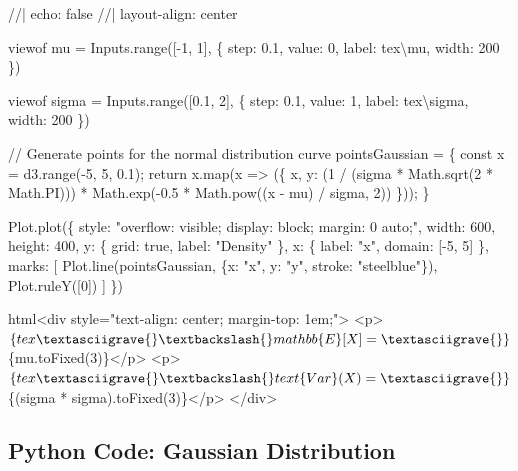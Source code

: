 \documentclass[
  letterpaper,
  DIV=11,
  numbers=noendperiod]{scrreprt}
\newenvironment{Shaded}{\begin{snugshade}}{\end{snugshade}}
\newcommand{\NormalTok}[1]{\textcolor[rgb]{0.00,0.23,0.31}{#1}}
\begin{document}
\label{observable}
\begin{Shaded}
\begin{Highlighting}[]
\NormalTok{//| echo: false}
\NormalTok{//| layout{-}align: center}

\NormalTok{viewof mu = Inputs.range([{-}1, 1], \{}
\NormalTok{  step: 0.1,}
\NormalTok{  value: 0,}
\NormalTok{  label: tex\textasciigrave{}\textbackslash{}mu\textasciigrave{},}
\NormalTok{  width: 200}
\NormalTok{\})}

\NormalTok{viewof sigma = Inputs.range([0.1, 2], \{}
\NormalTok{  step: 0.1,}
\NormalTok{  value: 1,}
\NormalTok{  label: tex\textasciigrave{}\textbackslash{}sigma\textasciigrave{},}
\NormalTok{  width: 200}
\NormalTok{\})}

\NormalTok{// Generate points for the normal distribution curve}
\NormalTok{pointsGaussian = \{}
\NormalTok{  const x = d3.range({-}5, 5, 0.1);}
\NormalTok{  return x.map(x =\textgreater{} (\{}
\NormalTok{    x,}
\NormalTok{    y: (1 / (sigma * Math.sqrt(2 * Math.PI))) * }
\NormalTok{       Math.exp({-}0.5 * Math.pow((x {-} mu) / sigma, 2))}
\NormalTok{  \}));}
\NormalTok{\}}

\NormalTok{Plot.plot(\{}
\NormalTok{  style: "overflow: visible; display: block; margin: 0 auto;",}
\NormalTok{  width: 600,}
\NormalTok{  height: 400,}
\NormalTok{  y: \{}
\NormalTok{    grid: true,}
\NormalTok{    label: "Density"}
\NormalTok{  \},}
\NormalTok{  x: \{}
\NormalTok{    label: "x",}
\NormalTok{    domain: [{-}5, 5]}
\NormalTok{  \},}
\NormalTok{  marks: [}
\NormalTok{    Plot.line(pointsGaussian, \{x: "x", y: "y", stroke: "steelblue"\}),}
\NormalTok{    Plot.ruleY([0])}
\NormalTok{  ]}
\NormalTok{\})}

\NormalTok{html\textasciigrave{}\textless{}div style="text{-}align: center; margin{-}top: 1em;"\textgreater{}}
\NormalTok{  \textless{}p\textgreater{}$\{tex\textasciigrave{}\textbackslash{}mathbb\{E\}[X] =\textasciigrave{}\} $\{mu.toFixed(3)\}\textless{}/p\textgreater{}}
\NormalTok{  \textless{}p\textgreater{}$\{tex\textasciigrave{}\textbackslash{}text\{Var\}(X) =\textasciigrave{}\} $\{(sigma * sigma).toFixed(3)\}\textless{}/p\textgreater{}}
\NormalTok{\textless{}/div\textgreater{}\textasciigrave{}}
\end{Highlighting}
\end{Shaded}

\subsection{Python Code: Gaussian
Distribution}\label{python-code-gaussian-distribution}
\end{document}
